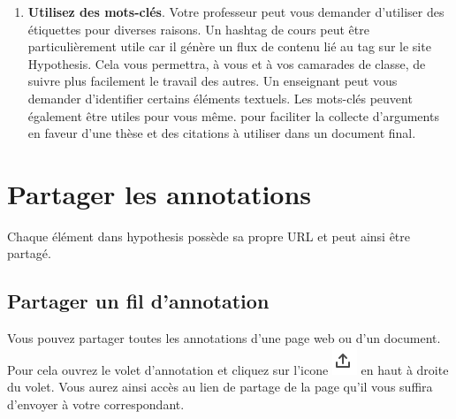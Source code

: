 \documentclass[
]{book}
\begin{document}
\begin{enumerate}
\item
  \textbf{Utilisez des mots-clés}. Votre professeur peut vous demander d'utiliser des étiquettes pour diverses raisons. Un hashtag de cours peut être particulièrement utile car il génère un flux de contenu lié au tag sur le site Hypothesis. Cela vous permettra, à vous et à vos camarades de classe, de suivre plus facilement le travail des autres. Un enseignant peut vous demander d'identifier certains éléments textuels. Les mots-clés peuvent également être utiles pour vous même. pour faciliter la collecte d'arguments en faveur d'une thèse et des citations à utiliser dans un document final.
\end{enumerate}

\hypertarget{s4}{%
\chapter{Partager les annotations}\label{s4}}

Chaque élément dans hypothesis possède sa propre URL et peut ainsi être partagé.

\hypertarget{s41}{%
\section{Partager un fil d'annotation}\label{s41}}

Vous pouvez partager toutes les annotations d'une page web ou d'un document. Pour cela ouvrez le volet d'annotation et cliquez sur l'icone \includegraphics{img/9ed8e6410bcd25e02923bf774a7fb2fe.png} en haut à droite du volet. Vous aurez ainsi accès au lien de partage de la page qu'il vous suffira d'envoyer à votre correspondant.
\end{document}
